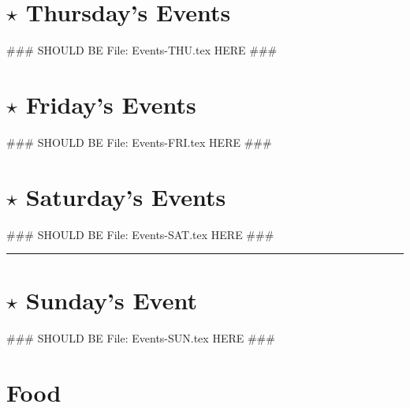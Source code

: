 \documentclass[9pt,twoside,openright,final,article,letterpaper]{memoir}
\renewcommand{\pfbreakdisplay}{%
  \needspace{24pt}%
  \vspace{8pt}\\\ding{76}\quad\ding{77}\quad\ding{78}\\%
  \vspace{11pt}}
\let\oldsection=\section
\renewcommand{\section}[1]{%
  \nopagebreak
  \vspace{6pt} %
  \needspace{1.5in}
  \oldsection{#1}
  \nopagebreak}
\begin{document}
{ \hline }

\section{{\Large $\star$} Thursday's Events}
\begin{multicols}{2}
 ### SHOULD BE File: Events-THU.tex HERE ### 


\end{multicols}


\section{{\Large $\star$} Friday's Events}
\begin{multicols}{2}
 ### SHOULD BE File: Events-FRI.tex HERE ### 


\end{multicols}

{ \hline }

\begin{multicols}{2}
  \section{{\Large $\star$} Saturday's Events}
 ### SHOULD BE File: Events-SAT.tex HERE ### 



  \fancybreak{\pfbreakdisplay}

  \section{{\Large $\star$} Sunday's Event}
 ### SHOULD BE File: Events-SUN.tex HERE ### 


\end{multicols}

\section{Food}
\end{document}
